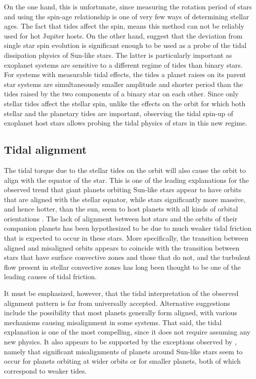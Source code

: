 On the one hand, this is unfortunate, since measuring the rotation period of
stars and using the spin-age relationship is one of very few ways of determining
stellar ages. The fact that tides affect the spin, means this method can not be
reliably used for hot Jupiter hosts. On the other hand, \citet{Penev_et_al_18}
suggest that the deviation from single star spin evolution is significant enough
to be used as a probe of the tidal dissipation physics of Sun-like stars. The
latter is particularly important as exoplanet systems are sensitive to a
different regime of tides than binary stars. For systems with measurable tidal
effects, the tides a planet raises on its parent star systems are simultaneously
smaller amplitude and shorter period than the tides raised by the two components
of a binary star on each other. Since only stellar tides affect the stellar
spin, unlike the effects on the orbit for which both stellar and the planetary
tides are important, observing the tidal spin-up of exoplanet host stars allows
probing the tidal physics of stars in this new regime.

\subsection{Tidal alignment}

The tidal torque due to the stellar tides on the orbit will also cause the orbit
to align with the equator of the star. This is one of the leading explanations
for the observed trend that giant planets orbiting Sun-like stars appear to have
orbits that are aligned with the stellar equator, while stars significantly more
massive, and hence hotter, than the sun, seem to host planets with all kinds of
orbital orientations \citep[c.f. Fig 3 and Fig 8 of][]{Albrecht_et_al_22}. The
lack of alignment between hot stars and the orbits of their companion planets
has been hypothesized to be due to much weaker tidal friction that is expected
to occur in these stars. More specifically, the transition between aligned and
misaligned orbits appears to coincide with the transition between stars that
have surface convective zones and those that do not, and the turbulent flow
present in stellar convective zones has long been thought to be one of the
leading causes of tidal friction.

It must be emphasized, however, that the tidal interpretation of the observed
alignment pattern is far from universally accepted.  Alternative suggestions
include the possibility that most planets generally form aligned, with various
mechanisms causing misalignment in some systems. That said, the tidal
explanation is one of the most compelling, since it does not require assuming
any new physics. It also appears to be supported by the exceptions observed by
\citet{Winn_Fabrycky_2015}, namely that significant misalignments of planets
around Sun-like stars seem to occur for planets orbiting at wider orbits or for
smaller planets, both of which correspond to weaker tides.


